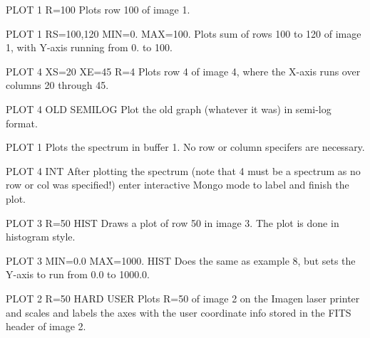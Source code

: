 {\newpage\clearpage
{}%
\begin{example}
  \item[PLOT 1 R=100]{Plots row 100 of image 1.}
  \item[PLOT 1 RS=100,120 MIN=0. MAX=100.]{  Plots sum of rows 100 to
       120 of image 1, with Y-axis running from 0. to 100.}
  \item[PLOT 4 XS=20 XE=45 R=4]{Plots row 4 of image 4,
       where the X-axis runs over columns 20 through 45.}
  \item[PLOT 4 OLD SEMILOG]{Plot the old graph (whatever it was)
       in semi-log format.}
  \item[PLOT 1]{Plots the spectrum in buffer 1.  No
       row or column specifers are necessary.}
  \item[PLOT 4 INT ]{After plotting the spectrum (note that 4
       must be a spectrum as no row or col was
       specified!) enter interactive Mongo mode
       to label and finish the plot.}
  \item[PLOT 3 R=50 HIST]{Draws a plot of row 50 in image 3.
       The plot is d}one in histogram style.
  \item[PLOT 3 MIN=0.0 MAX=1000. HIST]{Does the same as example
       8, but sets the Y-axis to run from 0.0 to 1000.0.}
  \item[PLOT 2 R=50 HARD USER]{Plots R=50 of image 2 on the Imagen laser
       printer and scales and labels the axes with
       the user coordinate info stored in the FITS header of image 2.}
\end{example}%
\lthtmlfigureZ
\lthtmlcheckvsize\clearpage}

